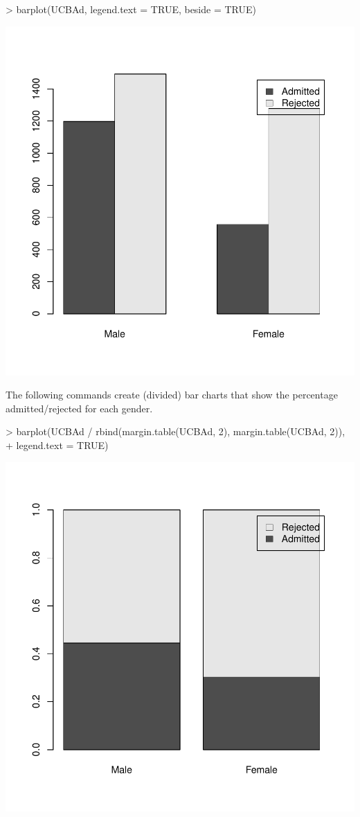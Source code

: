 \documentclass[12pt,letterpaper,final]{article}
\begin{document}
\begin{Schunk}
\begin{Sinput}
> barplot(UCBAd, legend.text = TRUE, beside = TRUE)
\end{Sinput}
\end{Schunk}
\includegraphics{lect_main-013}

The following commands create (divided) bar charts that show
the percentage admitted/rejected for each gender.

\begin{Schunk}
\begin{Sinput}
> barplot(UCBAd / rbind(margin.table(UCBAd, 2), margin.table(UCBAd, 2)), 
+   legend.text = TRUE)
\end{Sinput}
\end{Schunk}
\includegraphics{lect_main-014}
\end{document}
